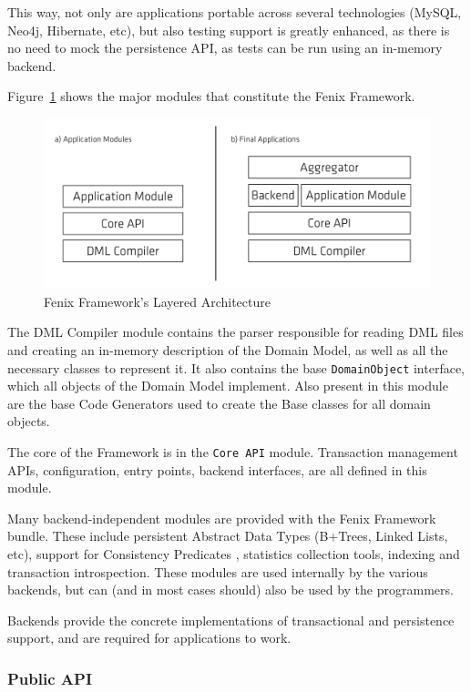 \documentclass{llncs}
\begin{document}
This way, not only are applications portable across several
technologies (MySQL, Neo4j, Hibernate, etc), but also testing support is
greatly enhanced, as there is no need to mock the persistence API, as
tests can be run using an in-memory backend.

Figure~\ref{fig:ff-arch} shows the major modules that constitute the Fenix
Framework.

\begin{figure}
\centering
\includegraphics[width=0.8\linewidth]{ff-arch}
\caption{Fenix Framework's Layered Architecture}
\label{fig:ff-arch}
\end{figure}

The DML Compiler module contains the parser responsible for reading
DML files and creating an in-memory description of the Domain Model,
as well as all the necessary classes to represent it. It also contains
the base \texttt{DomainObject} interface, which all objects of the Domain
Model implement. Also present in this module are the base Code
Generators used to create the Base classes for all domain
objects.

The core of the Framework is in the \texttt{Core API} module. Transaction
management APIs, configuration, entry points, backend interfaces, are
all defined in this module.

Many backend-independent modules are provided with the Fenix Framework
bundle. These include persistent Abstract Data Types (B+Trees, Linked
Lists, etc), support for Consistency
Predicates \cite{JoaoCoutinhoNeves2011}, statistics collection tools,
indexing and transaction introspection. These modules are used
internally by the various backends, but can (and in most cases should)
also be used by the programmers.

Backends provide the concrete implementations of transactional and
persistence support, and are required for applications to work.

\subsubsection{Public API}
\end{document}
